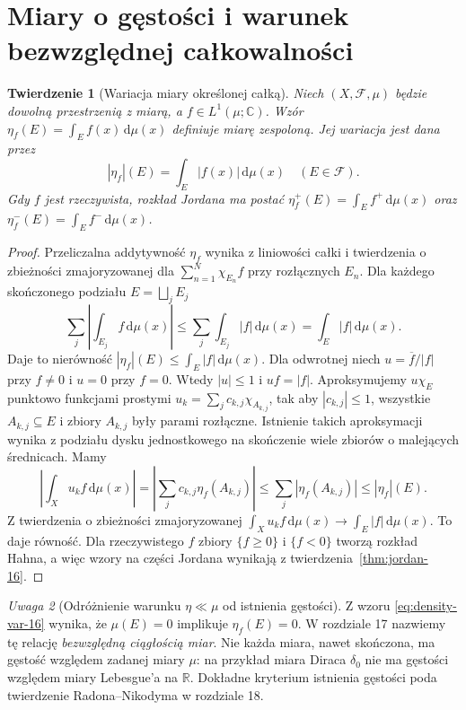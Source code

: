 \documentclass[11pt,a4paper,oneside]{book}
\numberwithin{equation}{chapter}
\theoremstyle{plain}
\newtheorem{twierdzenie}{Twierdzenie}[chapter]
\theoremstyle{definition}
\theoremstyle{remark}
\newtheorem{uwaga}[twierdzenie]{Uwaga}
\begin{document}
\section{Miary o gęstości i warunek bezwzględnej całkowalności}
\begin{twierdzenie}[Wariacja miary określonej całką]
\label{thm:density-variation-16}
Niech $(X,\mathcal F,\mu)$ będzie dowolną przestrzenią
z miarą, a $f\in L^1(\mu;\mathbb C)$. Wzór
$\eta_f(E)=\int_E f(x)\,\mathrm d\mu(x)$
definiuje miarę zespoloną. Jej wariacja jest dana przez
\begin{equation}\label{eq:density-var-16}
|\eta_f|(E)=\int_E|f(x)|\,\mathrm d\mu(x)
\quad(E\in\mathcal F).
\end{equation}
Gdy $f$ jest rzeczywista, rozkład Jordana ma postać
$\eta_f^+(E)=\int_E f^+\,\mathrm d\mu(x)$ oraz
$\eta_f^-(E)=\int_E f^-\,\mathrm d\mu(x)$.
\end{twierdzenie}
\begin{proof}
Przeliczalna addytywność $\eta_f$ wynika z liniowości
całki i twierdzenia o zbieżności zmajoryzowanej dla
$\sum_{n=1}^N\chi_{E_n}f$ przy rozłącznych $E_n$.
Dla każdego skończonego podziału $E=\bigsqcup_jE_j$
\[
\sum_j\left|\int_{E_j}f\,\mathrm d\mu(x)\right|
\le\sum_j\int_{E_j}|f|\,\mathrm d\mu(x)
=\int_E|f|\,\mathrm d\mu(x).
\]
Daje to nierówność $|\eta_f|(E)\le\int_E|f|\,\mathrm d\mu(x)$.
Dla odwrotnej niech $u=\overline f/|f|$ przy $f\ne0$
i $u=0$ przy $f=0$. Wtedy $|u|\le1$ i $uf=|f|$.
Aproksymujemy $u\chi_E$ punktowo funkcjami prostymi
$u_k=\sum_jc_{k,j}\chi_{A_{k,j}}$, tak aby
$|c_{k,j}|\le1$, wszystkie $A_{k,j}\subseteq E$ i zbiory
$A_{k,j}$ były parami rozłączne.
Istnienie takich aproksymacji wynika z podziału dysku
jednostkowego na skończenie wiele zbiorów o malejących
średnicach. Mamy
\[
\left|\int_Xu_kf\,\mathrm d\mu(x)\right|
=\left|\sum_jc_{k,j}\eta_f(A_{k,j})\right|
\le\sum_j|\eta_f(A_{k,j})|\le|\eta_f|(E).
\]
Z twierdzenia o zbieżności zmajoryzowanej
$\int_Xu_kf\,\mathrm d\mu(x)\to\int_E|f|\,\mathrm d\mu(x)$.
To daje równość. Dla rzeczywistego $f$ zbiory
$\{f\ge0\}$ i $\{f<0\}$ tworzą rozkład Hahna,
a więc wzory na części Jordana wynikają z
twierdzenia~\ref{thm:jordan-16}.
\end{proof}

\begin{uwaga}[Odróżnienie warunku $\eta\ll\mu$ od istnienia gęstości]
Z wzoru \eqref{eq:density-var-16} wynika, że
$\mu(E)=0$ implikuje $\eta_f(E)=0$. W rozdziale 17
nazwiemy tę relację \emph{bezwzględną ciągłością miar}.
Nie każda miara, nawet skończona, ma gęstość względem
zadanej miary $\mu$: na przykład miara Diraca $\delta_0$
nie ma gęstości względem miary Lebesgue'a na $\mathbb R$.
Dokładne kryterium istnienia gęstości poda twierdzenie
Radona--Nikodyma w rozdziale 18.
\end{uwaga}
\end{document}
